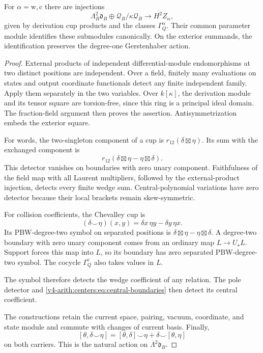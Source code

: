 \begin{theorem}\label{v4-arith:centers:thm:common-two}
For $\alpha=\mathrm w,\mathrm c$
there are injections
\[
 \Lambda_B^2\mathfrak d_B
 \oplus\mathcal Q_B/\kappa\mathcal Q_B
 \longrightarrow H^2Z_\alpha,
\]
given by derivation cup
products and the classes
$\Gamma_Q^\alpha$.
Their common parameter
module identifies these
submodules canonically.
On the exterior summands,
the identification preserves
the degree-one Gerstenhaber
action.
\end{theorem}

\begin{proof}
External products of
independent differential-module
endomorphisms at two
distinct positions are
independent. Over a field,
finitely many evaluations
on states and output
coordinate functionals
detect any finite
independent family.
Apply them separately in
the two variables.
Over $k[\kappa]$, the
derivation module and its
tensor square are torsion-free,
since this ring is a
principal ideal domain.
The fraction-field argument
then proves the assertion.
Antisymmetrization embeds
the exterior square.

For words, the two-singleton
component of a cup is
$r_{12}(\delta\boxtimes\eta)$.
Its sum with the exchanged
component is
\[
 r_{12}(\delta\boxtimes\eta-\eta\boxtimes\delta).
\]
This detector vanishes on
boundaries with zero unary
component. Faithfulness of
the field map with all
Laurent multipliers, followed
by the external-product
injection, detects every
finite wedge sum.
Central-polynomial variations
have zero detector because
their local brackets remain
skew-symmetric.

For collision coefficients,
the Chevalley cup is
\[
 (\delta\smile\eta)(x,y)
 =\delta x\,\eta y-\delta y\,\eta x.
\]
Its PBW-degree-two symbol
on separated positions is
$\delta\boxtimes\eta-
\eta\boxtimes\delta$.
A degree-two boundary with
zero unary component comes
from an ordinary map
$L\to U_\star L$.
Support forces this map
into $L$, so its boundary
has zero separated
PBW-degree-two symbol.
The cocycle
$\Gamma_Q^{\mathrm c}$
also takes values in $L$.

The symbol therefore
detects the wedge
coefficient of any
relation. The pole
detector and
\eqref{v4-arith:centers:eq:central-boundaries}
then detect its central
coefficient.

The constructions retain
the current space, pairing,
vacuum, coordinate, and
state module and commute
with changes of current
basis. Finally,
\[
 [\theta,\delta\smile\eta]
 =[\theta,\delta]\smile\eta+
       \delta\smile[\theta,\eta]
\]
on both carriers. This
is the natural action
on $\Lambda^2\mathfrak d_B$.
\end{proof}

